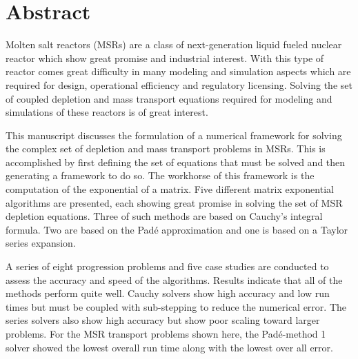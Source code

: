 \chapter*{Abstract}\label{ch:abstract}
Molten salt reactors (MSRs) are a class of next-generation liquid fueled nuclear reactor which show great promise and industrial interest. With this type of reactor comes great difficulty in many modeling and simulation aspects which are required for design, operational efficiency and regulatory licensing. Solving the set of coupled depletion and mass transport equations required for modeling and simulations of these reactors is of great interest. 

This manuscript discusses the formulation of a numerical framework for solving the complex set of depletion and mass transport problems in MSRs. This is accomplished by first defining the set of equations that must be solved and then generating a framework to do so. The workhorse of this framework is the computation of the exponential of a matrix. Five different matrix exponential algorithms are presented, each showing great promise in solving the set of MSR depletion equations. Three of such methods are based on Cauchy's integral formula. Two are based on the Pad\'e approximation and one is based on a Taylor series expansion. 

A series of eight progression problems and five case studies are conducted to assess the accuracy and speed of the algorithms. Results indicate that all of the methods perform quite well. Cauchy solvers show high accuracy and low run times but must be coupled with sub-stepping to reduce the numerical error. The series solvers also show high accuracy but show poor scaling toward larger problems. For the MSR transport problems shown here, the Pad\'e-method 1 solver showed the lowest overall run time along with the lowest over all error. 
